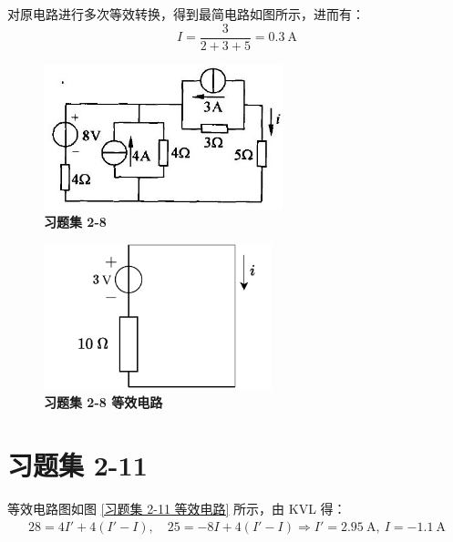 \documentclass[UTF8]{report}
\theoremstyle{MyLineTheoremStyle} %
\theoremstyle{MyBlockTheoremStyle} %
\theoremstyle{MySubsubsectionStyle} %
\begin{document}
对原电路进行多次等效转换，得到最简电路如图所示，进而有：
\begin{equation*}
I = \frac{3}{2+3+5} = 0.3\ \mathrm{A}
\end{equation*}

\noindent\begin{minipage}{0.49\textwidth}
    \begin{figure}[H]\centering
        \includegraphics[height=120pt]{assets/2/78abd22edee32bbd38134d510246a9ab.jpg}
        \caption{\textbf{习题集 2-8}}
    \end{figure}
\end{minipage}\hfill
\begin{minipage}{0.49\textwidth}
\begin{figure}[H]\centering
\includegraphics[height=120pt]{assets/2/2-8.drawio.pdf}
\caption{\textbf{习题集 2-8 等效电路}}\label{习题集 2-8 等效电路}
\end{figure}
\end{minipage}

\section{习题集 2-11}

等效电路图如图 \ref{习题集 2-11 等效电路} 所示，由 KVL 得：
\begin{gather*}
28 = 4I' + 4(I' - I),\quad 25 = -8I + 4(I' - I) \Longrightarrow I' = 2.95\ \mathrm{A},\ I = -1.1\ \mathrm{A}
\end{gather*}
\end{document}

